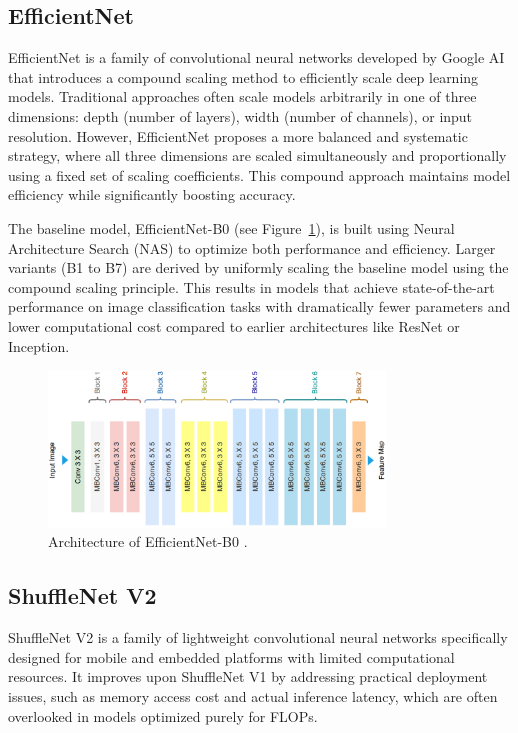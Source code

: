 \subsection{EfficientNet}
EfficientNet is a family of convolutional neural networks developed by Google AI that introduces a compound scaling method to efficiently scale deep learning models. Traditional approaches often scale models arbitrarily in one of three dimensions: depth (number of layers), width (number of channels), or input resolution. However, EfficientNet proposes a more balanced and systematic strategy, where all three dimensions are scaled simultaneously and proportionally using a fixed set of scaling coefficients. This compound approach maintains model efficiency while significantly boosting accuracy.

The baseline model, EfficientNet-B0 (see Figure~\ref{fig:figure13}), is built using Neural Architecture Search (NAS) to optimize both performance and efficiency. Larger variants (B1 to B7) are derived by uniformly scaling the baseline model using the compound scaling principle. This results in models that achieve state-of-the-art performance on image classification tasks with dramatically fewer parameters and lower computational cost compared to earlier architectures like ResNet or Inception.

\begin{figure}[H] %
    \centering
    \includegraphics[width=0.8\textwidth]{chapters/chapter1/images/Figure13.png}
    \caption{Architecture of EfficientNet-B0 \parencite{ahmed2022classification}.}
    \label{fig:figure13}
\end{figure}

\subsection{ShuffleNet V2}

ShuffleNet V2 is a family of lightweight convolutional neural networks specifically designed for mobile and embedded platforms with limited computational resources. It improves upon ShuffleNet V1 by addressing practical deployment issues, such as memory access cost and actual inference latency, which are often overlooked in models optimized purely for FLOPs.

